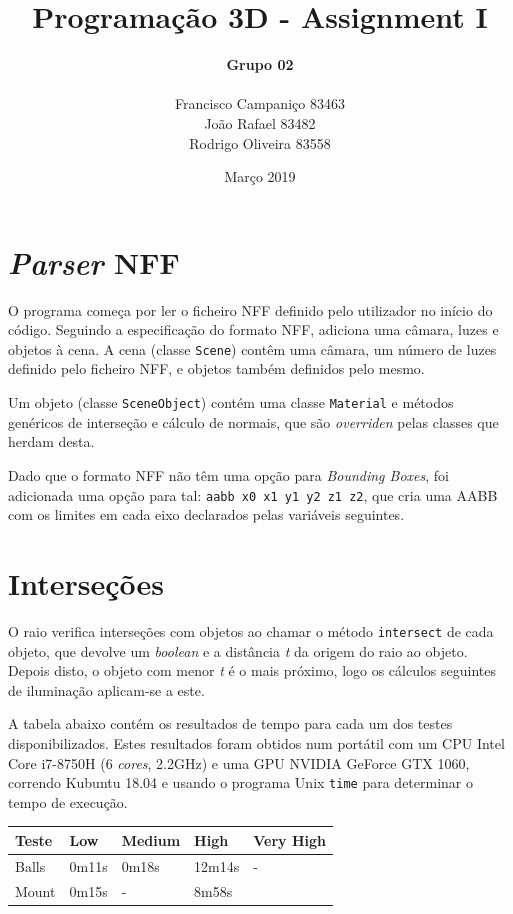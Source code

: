 \documentclass{article}
\title{
    \textbf{Programação 3D - Assignment I}
    }
\author{
    \begin{Large}
        \textbf{Grupo 02}
    \end{Large}\\
    Francisco Campaniço 83463\\
    João Rafael 83482\\
    Rodrigo Oliveira 83558
}
\date{Março 2019}
\begin{document}
    \maketitle

    \section*{\textit{Parser} NFF}

        \par 
        O programa começa por ler o ficheiro NFF definido pelo utilizador no início do código. Seguindo a especificação do formato NFF, adiciona uma câmara, luzes e objetos à cena. A cena (classe \texttt{Scene}) contêm uma câmara, um número de luzes definido pelo ficheiro NFF, e objetos também definidos pelo mesmo.
        \par
        Um objeto (classe \texttt{SceneObject}) contém uma classe \texttt{Material} e métodos genéricos de interseção e cálculo de normais, que são \textit{overriden} pelas classes que herdam desta.
        \par
        Dado que o formato NFF não têm uma opção para \textit{Bounding Boxes}, foi adicionada uma opção para tal: \texttt{aabb x0 x1 y1 y2 z1 z2}, que cria uma AABB com os limites em cada eixo declarados pelas variáveis seguintes.

    \section*{Interseções}

        \par
        O raio verifica interseções com objetos ao chamar o método \texttt{intersect} de cada objeto, que devolve um \textit{boolean} e a distância \textit{t} da origem do raio ao objeto. Depois disto, o objeto com menor \textit{t} é o mais próximo, logo os cálculos seguintes de iluminação aplicam-se a este.

        \par
        A tabela abaixo contém os resultados de tempo para cada um dos testes disponibilizados. Estes resultados foram obtidos num portátil com um CPU Intel Core i7-8750H (6 \textit{cores}, 2.2GHz) e uma GPU NVIDIA GeForce GTX 1060, correndo Kubuntu 18.04 e usando o programa Unix \texttt{time} para determinar o tempo de execução.

        \begin{table}[h]
            \centering
            \begin{tabular}{|l|l|l|l|l|}
                \hline
                Teste & Low     & Medium    & High     & Very High \\ \hline
                Balls & 0m11s   & 0m18s     & 12m14s   & -         \\ \hline
                Mount & 0m15s   & -         & 8m58s    &           \\ \hline
            \end{tabular}
        \end{table}
\end{document}

